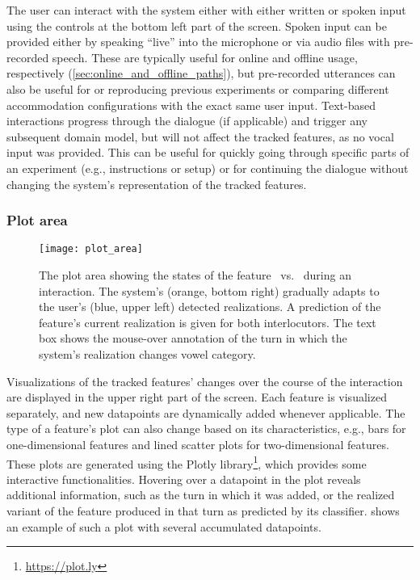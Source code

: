 The user can interact with the system either with either written or spoken input using the controls at the bottom left part of the screen.
Spoken input can be provided either by speaking \enquote{live} into the microphone or via audio files with pre-recorded speech.
These are typically useful for online and offline usage, respectively (\cref{sec:online_and_offline_paths}), but pre-recorded utterances can also be useful for or reproducing previous experiments or comparing different accommodation configurations with the exact same user input.
Text-based interactions progress through the dialogue (if applicable) and trigger any subsequent domain model, but will not affect the tracked features, as no vocal input was provided.
This can be useful for quickly going through specific parts of an experiment (e.g., instructions or setup) or for continuing the dialogue without changing the system's representation of the tracked features.

\subsubsection{Plot area}
\label{subsubsec:plot_area}

\begin{figure}[t]
	\centering
	\texttt{[image: plot\_area]}
	\caption[Real-time dynamic visualization of phonetic changes]
		{The plot area showing the states of the feature \textipa{[E:]}~vs.~\textipa{[e:]} during an interaction.
		The system's (orange, bottom right) gradually adapts to the user's (blue, upper left) detected realizations.
		A prediction of the feature's current realization is given for both interlocutors.
		The text box shows the mouse-over annotation of the turn in which the system's realization changes vowel category.}
	\label{fig:plot}
\end{figure}

Visualizations of the tracked features' changes over the course of the interaction are displayed in the upper right part of the screen.
Each feature is visualized separately, and new datapoints are dynamically added whenever applicable.
The type of a feature's plot can also change based on its characteristics, e.g., bars for one-dimensional features and lined scatter plots for two-dimensional features.
These plots are generated using the Plotly library\footnote{\url{https://plot.ly}}, which provides some interactive functionalities.
Hovering over a datapoint in the plot reveals additional information, such as the turn in which it was added, or the realized variant of the feature produced in that turn as predicted by its classifier.
 shows an example of such a plot with several accumulated datapoints.


